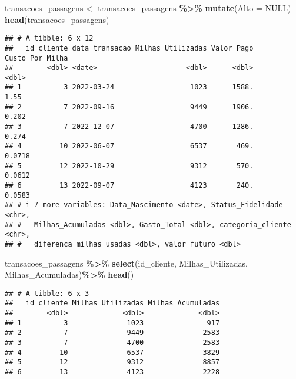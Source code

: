 \documentclass[
]{article}
\newenvironment{Shaded}{\begin{snugshade}}{\end{snugshade}}
\newcommand{\AttributeTok}[1]{\textcolor[rgb]{0.13,0.29,0.53}{#1}}
\newcommand{\ConstantTok}[1]{\textcolor[rgb]{0.56,0.35,0.01}{#1}}
\newcommand{\FunctionTok}[1]{\textcolor[rgb]{0.13,0.29,0.53}{\textbf{#1}}}
\newcommand{\NormalTok}[1]{#1}
\newcommand{\OtherTok}[1]{\textcolor[rgb]{0.56,0.35,0.01}{#1}}
\newcommand{\SpecialCharTok}[1]{\textcolor[rgb]{0.81,0.36,0.00}{\textbf{#1}}}
\begin{document}
\begin{Shaded}
\begin{Highlighting}[]
\NormalTok{transacoes\_passagens }\OtherTok{\textless{}{-}}\NormalTok{ transacoes\_passagens }\SpecialCharTok{\%\textgreater{}\%} 
  \FunctionTok{mutate}\NormalTok{(}\AttributeTok{Alto =} \ConstantTok{NULL}\NormalTok{)}
\FunctionTok{head}\NormalTok{(transacoes\_passagens)}
\end{Highlighting}
\end{Shaded}

\begin{verbatim}
## # A tibble: 6 x 12
##   id_cliente data_transacao Milhas_Utilizadas Valor_Pago Custo_Por_Milha
##        <dbl> <date>                     <dbl>      <dbl>           <dbl>
## 1          3 2022-03-24                  1023      1588.          1.55  
## 2          7 2022-09-16                  9449      1906.          0.202 
## 3          7 2022-12-07                  4700      1286.          0.274 
## 4         10 2022-06-07                  6537       469.          0.0718
## 5         12 2022-10-29                  9312       570.          0.0612
## 6         13 2022-09-07                  4123       240.          0.0583
## # i 7 more variables: Data_Nascimento <date>, Status_Fidelidade <chr>,
## #   Milhas_Acumuladas <dbl>, Gasto_Total <dbl>, categoria_cliente <chr>,
## #   diferenca_milhas_usadas <dbl>, valor_futuro <dbl>
\end{verbatim}

\begin{Shaded}
\begin{Highlighting}[]
\NormalTok{transacoes\_passagens }\SpecialCharTok{\%\textgreater{}\%} \FunctionTok{select}\NormalTok{(id\_cliente, Milhas\_Utilizadas, Milhas\_Acumuladas)}\SpecialCharTok{\%\textgreater{}\%} \FunctionTok{head}\NormalTok{()}
\end{Highlighting}
\end{Shaded}

\begin{verbatim}
## # A tibble: 6 x 3
##   id_cliente Milhas_Utilizadas Milhas_Acumuladas
##        <dbl>             <dbl>             <dbl>
## 1          3              1023               917
## 2          7              9449              2583
## 3          7              4700              2583
## 4         10              6537              3829
## 5         12              9312              8857
## 6         13              4123              2228
\end{verbatim}
\end{document}
